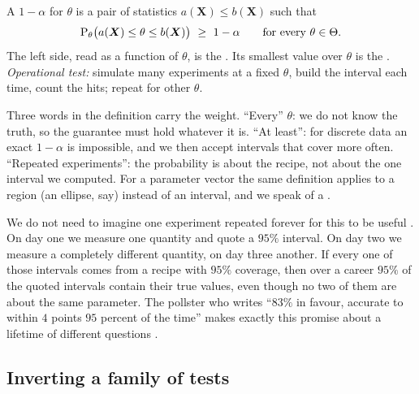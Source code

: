 \begin{workdef}
A $1-\alpha$  for $\theta$ is a pair of
statistics $a(\bm X)\le b(\bm X)$  such that 
\[
  \operatorname{P}_\theta\bigl(a(\bm X)\le\theta\le b(\bm X)\bigr)\ \ge\ 1-\alpha
  \qquad\text{for every }\theta\in\Theta .
\]
The left side, read as a function of $\theta$, is the
 
. Its smallest value over $\theta$ is the
 .
\emph{Operational test:} simulate many experiments at a fixed $\theta$, build
the interval each time, count the hits; repeat for other $\theta$.
\end{workdef}

Three words in the definition carry the weight. ``Every'' $\theta$: we do not
know the truth, so the guarantee must hold whatever it is. ``At least'':
for discrete data an exact $1-\alpha$ is impossible, and we then accept
intervals that cover more often. ``Repeated experiments'': the probability
is about the recipe, not about the one interval we computed. For a parameter
vector the same definition applies to a region (an ellipse, say) instead of an
interval, and we speak of a .

We do not need to imagine one experiment repeated forever for this to be
useful . On day one we measure one quantity and quote a $95\%$
interval. On day two we measure a completely different quantity, on day three
another. If every one of those intervals comes from a recipe with $95\%$
coverage, then over a career $95\%$ of the quoted intervals contain their
true values, even though no two of them are about the same parameter. The pollster who writes
``$83\%$ in favour, accurate to within $4$ points $95$ percent of the time''
makes exactly this promise about a lifetime of different questions
.

\subsection{Inverting a family of tests}
\label{4b:sec:inversion-theorem}

